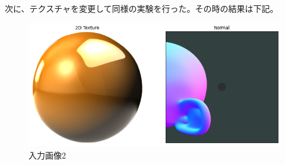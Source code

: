 \documentclass[dvipdfmx]{jsarticle}
\begin{document}
次に、テクスチャを変更して同様の実験を行った。その時の結果は下記。
\begin{figure}[H]
  \centering
  \includegraphics[scale=0.4]{images/suzzanne_input2.png}
  \caption{入力画像2}
\end{figure}
\end{document}
